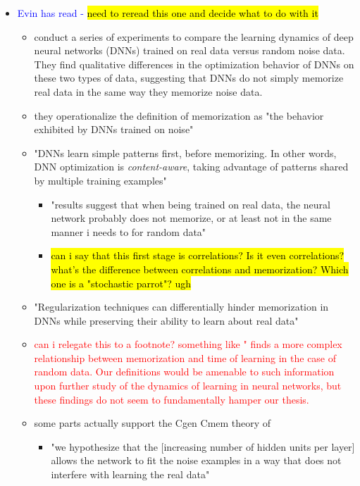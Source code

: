 \documentclass{article}
\begin{document}
\begin{itemize}
\begin{itemize}
        \item \textcolor{blue}{Evin has read -} \cite{arpit2017closer} \hl{need to reread this one and decide what to do with it}
        \begin{itemize}
            \item conduct a series of experiments to compare the learning dynamics of deep neural networks (DNNs) trained on real data versus random noise data. They find qualitative differences in the optimization behavior of DNNs on these two types of data, suggesting that DNNs do not simply memorize real data in the same way they memorize noise data.
            \item they operationalize the definition of memorization as "the behavior exhibited by DNNs trained on noise"
            \item "DNNs learn simple patterns first, before memorizing. In other words, DNN optimization is \textit{content-aware}, taking advantage of patterns shared by multiple training examples"
            \begin{itemize}
                \item "results suggest that when being trained on real data, the neural network probably does not memorize, or at least not in the same manner i needs to for random data"
                \item \hl{can i say that this first stage is correlations? Is it even correlations? what's the difference between correlations and memorization? Which one is a "stochastic parrot"? ugh}
            \end{itemize}
            \item "Regularization techniques can differentially hinder memorization in DNNs while preserving their ability to learn about real data"
            \item \textcolor{red}{can i relegate this to a footnote? something like "\cite{arpit2017closer} finds a more complex relationship between memorization and time of learning in the case of random data. Our definitions would be amenable to such information upon further study of the dynamics of learning in neural networks, but these findings do not seem to fundamentally hamper our thesis.}
            \item some parts actually support the Cgen Cmem theory of \cite{varma2023explaining}
            \begin{itemize}
                \item "we hypothesize that the [increasing number of hidden units per layer] allows the network to fit the noise examples in a way that does not interfere with learning the real data"

\end{itemize}
\end{itemize}
\end{itemize}
\end{itemize}
\end{document}
